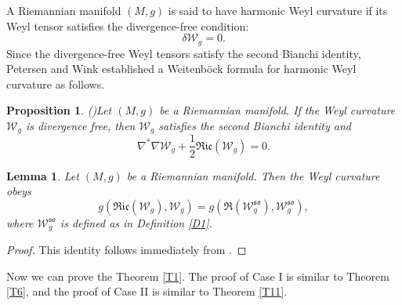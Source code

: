 \documentclass[12pt, twoside]{article}
\newtheorem{lemma}[theorem]{Lemma}
\newtheorem{proposition}[theorem]{Proposition}
\theoremstyle{definition}
\numberwithin{equation}{section}
\def\na {\nabla}
\begin{document}
	A Riemannian manifold $(M,g)$ is said to have harmonic Weyl curvature if its Weyl tensor satisfies the divergence-free condition:
	$$\delta\mathcal{W}_{g}=0.$$
	Since the divergence-free Weyl tensors satisfy the second Bianchi identity, Petersen and Wink \cite{PW22} established a Weitenb\"{o}ck formula for  harmonic Weyl curvature as follows.
\begin{proposition}(\cite[Proposition 2.2]{PW22})\label{P7}
	Let $(M,g)$ be a Riemannian manifold. If the Weyl curvature $\mathcal{W}_{g}$ is divergence free, then $\mathcal{W}_{g}$ satisfies the second Bianchi identity and
	$$\na^{\ast}\na\mathcal{W}_{g}+\frac{1}{2}\mathfrak{Ric}(\mathcal{W}_{g})=0.$$
\end{proposition}
\begin{lemma}\label{L3}
	Let $(M,g)$ be a Riemannian manifold. Then the Weyl curvature obeys
	$$g(\mathfrak{Ric}(\mathcal{W}_{g}),\mathcal{W}_{g})=g(\mathfrak{R}(\mathcal{W}^{\mathfrak{so}}_{g}),\mathcal{W}^{\mathfrak{so}}_{g}),$$
	where $\mathcal{W}^{\mathfrak{so}}_{g}$ is defined as in Definition \ref{D1}.
\end{lemma}
\begin{proof}
	This identity follows immediately from  \cite[Proposition 1.6]{PW21b}.
\end{proof}
Now we can prove the Theorem \ref{T1}. The proof of Case I is similar to Theorem \ref{T6}, and the proof of Case II is similar to Theorem \ref{T11}.
\end{document}
